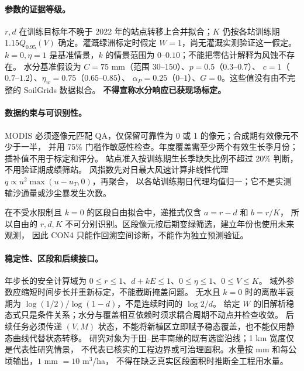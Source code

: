 \paragraph{参数的证据等级。}
$r,d$ 在训练目标年不晚于 2022 年的站点转移上合并拟合；$K$ 仍按各站训练期
$1.15Q_{0.95}(V)$ 确定。灌溉绿洲标定时假定 $W=1$，尚无灌溉实测验证这一假定。
$k=0,\eta=1$ 是基准情景，$k$ 的情景范围为 $0$--$0.10$；不能把零估计解释为风蚀不存在。
水分基准假设为 $C=75$ mm（范围 $30$--$150$）、$p=0.5$（$0.3$--$0.7$）、
$c=1$（$0.7$--$1.2$）、$\eta_w=0.75$（$0.65$--$0.85$）、
$\alpha_P=0.25$（$0$--$1$）、$G=0$。这些值没有由不完整的 SoilGrids 数据拟合。
\textbf{不得宣称水分响应已获现场标定。}

\paragraph{数据约束与可识别性。}
MODIS 必须逐像元匹配 QA，仅保留可靠性为 0 或 1 的像元；合成期有效像元不少于一半，
并用 75\% 门槛作敏感性检查。年度覆盖需至少两个有效生长季月份；插补值不用于标定和评分。
站点准入按训练期生长季缺失比例不超过 20\% 判断，不用验证期成绩筛站。
风指数先对日最大风速计算非线性代理 $q\propto u^2\max(u-u_T,0)$，再聚合，
以各站训练期日代理均值归一；它不是实测输沙通量或沙尘暴发生次数。

在不受水限制且 $k=0$ 的区段自由拟合中，递推式仅含 $a=r-d$ 和 $b=r/K$，
所以自由的 $r,d,K$ 不可分别识别。区段像元按后期变绿筛选，建立年份也使用未来观测，
因此 CON4 只能作回溯空间诊断，不能作为独立预测验证。

\paragraph{稳定性、区段和后续接口。}
年步长的安全计算域为 $0\le r\le1$、$d+kE\le1$、$0\le\eta\le1$、$0\le V\le K$。
域外参数应缩短时间步长并重新标定，不能截断掩盖问题。
无水且 $k=0$ 时的离散半衰期为 $\log(1/2)/\log(1-d)$，不是连续时间的 $\log2/d$。
给定 $W$ 的旧解析稳态式只是条件关系；水分与覆盖相互依赖时须求耦合周期不动点并检查收敛。
后续任务必须传递 $(V,M)$ 状态，不能将新植区立即赋予稳态覆盖，也不能仅用静态曲线代替状态转移。
研究对象为于田--民丰南缘的既有选窗沿线；1 km 宽度仅是代表性研究情景，
不代表已核实的工程边界或可治理面积。水量按 mm 和每公顷输出，$1$ mm $=10$ m$^3$/ha，
不得在缺乏真实区段面积时推断全工程用水量。

